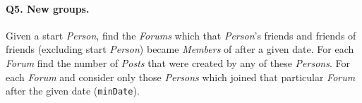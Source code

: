 \paragraph{\textbf{Q5}. New groups.}
Given a start \emph{Person}, find the \emph{Forums} which that
\emph{Person}'s friends and friends of friends (excluding start
\emph{Person}) became \emph{Members} of after a given date. For each
\emph{Forum} find the number of \emph{Posts} that were created by any of
these \emph{Persons}. For each \emph{Forum} and consider only those
\emph{Persons} which joined that particular \emph{Forum} after the given
date (\texttt{minDate}).
